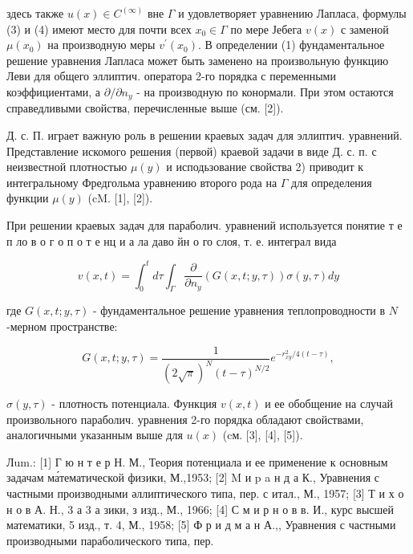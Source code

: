 \documentclass[10pt]{article}
\begin{document}
здесь также $u(x) \in C^{(\infty)}$ вне $\Gamma$ и удовлетворяет уравнению Лапласа, формулы (3) и (4) имеют место для почти всех $x_{0} \in \Gamma$ по мере Јебега $v(x)$ с заменой $\mu\left(x_{0}\right)$ на производную меры $v^{\prime}\left(x_{0}\right)$. В определении (1) фундаментальное решение уравнения Лапласа может быть заменено на произвольную функцию Леви для общего эллиптич. оператора 2-го порядка с переменными коэффициентами, а $\partial / \partial n_{y}$ - на производную по конормали. При этом остаются справедливыми свойства, перечисленные выше (см. [2]).



Д. с. П. играет важную роль в решении краевых задач для эллиптич. уравнений. Представление искомого решения (первой) краевой задачи в виде Д. с. п. с неизвестной плотностью $\mu(y)$ и исподьзование свойства 2) приводит к интегральному Фредгольма уравнению второго рода на $\Gamma$ для определения функции $\mu(y)$ (cM. [1], [2]).



При решении краевых задач для параболич. уравнений используется понятие т е п ло в о г о п о т е нц и а ла даво йн о го слоя, т. е. интеграл вида



\[

v(x, t)=\int_{0}^{t} d \tau \int_{\Gamma} \frac{\partial}{\partial n_{y}}(G(x, t ; y, \tau)) \sigma(y, \tau) d y

\]



где $G(x, t ; y, \tau)$ - фундаментальное решение уравнения теплопроводности в $N$-мерном пространстве:



\[

G(x, t ; y, \tau)=\frac{1}{(2 \sqrt{\pi})^{N}(t-\tau)^{N / 2}} e^{-r_{x y}^{2} / 4(t-\tau)},

\]



$\sigma(y, \tau)$ - плотность потенциала. Функция $v(x, t)$ и ее обобщение на случай произвольного параболич. уравнения 2-го порядка обладают свойствами, аналогичными указанным выше для $u(x)$ (cм. [3], [4], [5]).



Лum.: [1] Г ю н т е р Н. М., Теория потенциала и ее применение к основным задачам ма́тематической физики, М.,1953; [2] M и p a н д а К., Уравнения с частными производными әллиптического типа, пер. с итал., М., 1957; [3] Т и х о н о в А. Н., 3 а 3 а зики, з изд., М., 1966; [4] С м и р н о в в. И., курс высшей математики, 5 изд., т. 4, М., 1958; [5] Ф р и д м а н А.,, Уравнения с частными производными параболического типа, пер.
\end{document}
